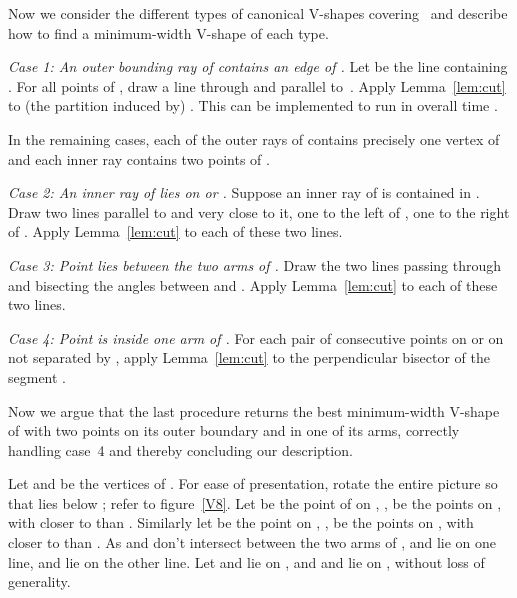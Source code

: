 \documentclass{llncs}
\begin{document}
Now we consider the different types of canonical V-shapes
covering~ and describe how to find a minimum-width V-shape of each
type.

\emph{Case 1: An outer bounding ray of  contains an edge  of .}
Let  be the line containing .  For all points  of ,
draw a line  through  and parallel to~.  Apply
Lemma~\ref{lem:cut} to (the partition induced by) .  This can be
implemented to run in overall time .

\smallskip

In the remaining cases, each of the outer rays of  contains
precisely one vertex of  and each inner ray contains two
points of .

\emph{Case 2: An inner ray of  lies on  or .}
Suppose an inner ray of  is contained in .
Draw two lines parallel to  and very close to it,
one to the left of , one to the right of .
Apply Lemma~\ref{lem:cut} to each of these two lines.

\emph{Case 3: Point  lies between the two arms of .}
Draw the two lines passing through  and bisecting the angles
between  and .  
Apply Lemma~\ref{lem:cut} to each of these two
lines.

\emph{Case 4: Point  is inside one arm of .}
For each pair of consecutive points  on  or
on  not separated by , apply Lemma~\ref{lem:cut} to the
perpendicular bisector of the segment .

Now we argue that the last procedure returns the best minimum-width
V-shape  of  with two points on its outer boundary and  in
one of its arms, correctly handling case~4 and thereby concluding our description.

Let  and  be the vertices of .  For ease of presentation,
rotate the entire picture so that  lies below ; refer to figure~\ref{V8}.
Let  be the point of  on , ,  be the points on , with  closer to  than .
Similarly let  be the point on , ,  be the points on , with  closer to  than . As  and  don't intersect between the two arms of ,  and  lie on one line,  and  lie on the other line.
Let  and  lie on , and  and  lie on
, without loss of generality.
\end{document}
